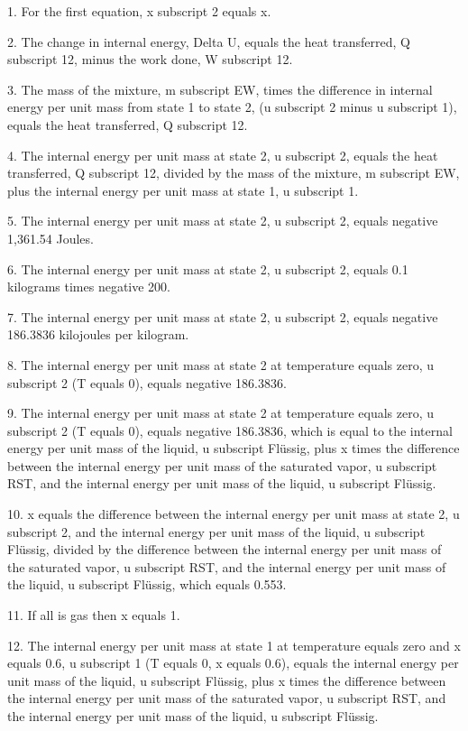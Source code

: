 1. For the first equation, x subscript 2 equals x.

2. The change in internal energy, Delta U, equals the heat transferred, Q subscript 12, minus the work done, W subscript 12.

3. The mass of the mixture, m subscript EW, times the difference in internal energy per unit mass from state 1 to state 2, (u subscript 2 minus u subscript 1), equals the heat transferred, Q subscript 12.

4. The internal energy per unit mass at state 2, u subscript 2, equals the heat transferred, Q subscript 12, divided by the mass of the mixture, m subscript EW, plus the internal energy per unit mass at state 1, u subscript 1.

5. The internal energy per unit mass at state 2, u subscript 2, equals negative 1,361.54 Joules.

6. The internal energy per unit mass at state 2, u subscript 2, equals 0.1 kilograms times negative 200.

7. The internal energy per unit mass at state 2, u subscript 2, equals negative 186.3836 kilojoules per kilogram.

8. The internal energy per unit mass at state 2 at temperature equals zero, u subscript 2 (T equals 0), equals negative 186.3836.

9. The internal energy per unit mass at state 2 at temperature equals zero, u subscript 2 (T equals 0), equals negative 186.3836, which is equal to the internal energy per unit mass of the liquid, u subscript Flüssig, plus x times the difference between the internal energy per unit mass of the saturated vapor, u subscript RST, and the internal energy per unit mass of the liquid, u subscript Flüssig.

10. x equals the difference between the internal energy per unit mass at state 2, u subscript 2, and the internal energy per unit mass of the liquid, u subscript Flüssig, divided by the difference between the internal energy per unit mass of the saturated vapor, u subscript RST, and the internal energy per unit mass of the liquid, u subscript Flüssig, which equals 0.553.

11. If all is gas then x equals 1.

12. The internal energy per unit mass at state 1 at temperature equals zero and x equals 0.6, u subscript 1 (T equals 0, x equals 0.6), equals the internal energy per unit mass of the liquid, u subscript Flüssig, plus x times the difference between the internal energy per unit mass of the saturated vapor, u subscript RST, and the internal energy per unit mass of the liquid, u subscript Flüssig.


